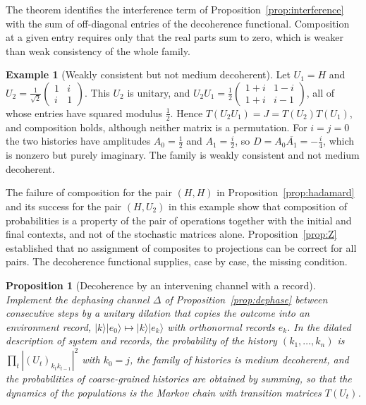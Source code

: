 \documentclass[11pt,oneside]{book}
\newtheorem{proposition}[theorem]{Proposition}
\theoremstyle{definition}
\newtheorem{example}[theorem]{Example}
\theoremstyle{remark}
\begin{document}
The theorem identifies the interference term of Proposition~\ref{prop:interference} with the sum of off-diagonal entries of the decoherence functional. Composition at a given entry requires only that the real parts sum to zero, which is weaker than weak consistency of the whole family.

\begin{example}[Weakly consistent but not medium decoherent]\label{ex:weak}
Let $U_1=H$ and $U_2=\tfrac1{\sqrt2}\begin{pmatrix}1&i\\i&1\end{pmatrix}$. This $U_2$ is unitary, and $U_2U_1=\tfrac12\begin{pmatrix}1+i&1-i\\1+i&i-1\end{pmatrix}$, all of whose entries have squared modulus $\tfrac12$. Hence $T(U_2U_1)=J=T(U_2)T(U_1)$, and composition holds, although neither matrix is a permutation. For $i=j=0$ the two histories have amplitudes $A_0=\tfrac12$ and $A_1=\tfrac i2$, so $D=A_0\overline{A_1}=-\tfrac i4$, which is nonzero but purely imaginary. The family is weakly consistent and not medium decoherent.
\end{example}

The failure of composition for the pair $(H,H)$ in Proposition~\ref{prop:hadamard} and its success for the pair $(H,U_2)$ in this example show that composition of probabilities is a property of the pair of operations together with the initial and final contexts, and not of the stochastic matrices alone. Proposition~\ref{prop:Z} established that no assignment of composites to projections can be correct for all pairs. The decoherence functional supplies, case by case, the missing condition.

\begin{proposition}[Decoherence by an intervening channel with a record]\label{prop:environment}
Implement the dephasing channel $\Delta$ of Proposition~\ref{prop:dephase} between consecutive steps by a unitary dilation that copies the outcome into an environment record, $|k\rangle|e_0\rangle\mapsto|k\rangle|e_k\rangle$ with orthonormal records $e_k$. In the dilated description of system and records, the probability of the history $(k_1,\dots,k_n)$ is $\prod_{t}|(U_t)_{k_tk_{t-1}}|^2$ with $k_0=j$, the family of histories is medium decoherent, and the probabilities of coarse-grained histories are obtained by summing, so that the dynamics of the populations is the Markov chain with transition matrices $T(U_t)$.
\end{proposition}
\end{document}
